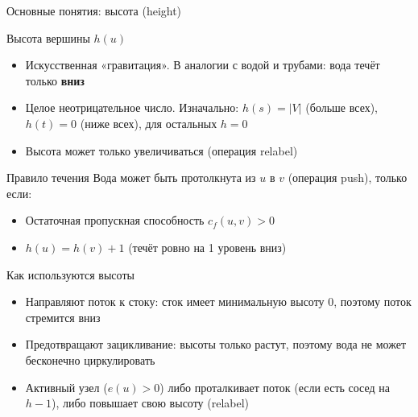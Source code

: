 \documentclass[14pt, aspectratio=169]{beamer}
\begin{document}
\begin{frame}{Основные понятия: высота (height)}
\scriptsize
\begin{block}{Высота вершины $h(u)$}
\begin{itemize}
\item Искусственная «гравитация». В аналогии с водой и трубами: вода течёт только \textbf{вниз}
\item Целое неотрицательное число. Изначально: $h(s) = |V|$ (больше всех), $h(t) = 0$ (ниже всех), для остальных $h = 0$ %
\item Высота может только увеличиваться (операция relabel)
\end{itemize}
\end{block}

\begin{block}{Правило течения}
Вода может быть протолкнута из $u$ в $v$ (операция push), только если:
\begin{itemize}
\item Остаточная пропускная способность $c_f(u, v) > 0$
\item $h(u) = h(v) + 1$ (течёт ровно на 1 уровень вниз)
\end{itemize}
\end{block}

\begin{block}{Как используются высоты}
\begin{itemize}
\item Направляют поток к стоку: сток имеет минимальную высоту 0, поэтому поток стремится вниз
\item Предотвращают зацикливание: высоты только растут, поэтому вода не может бесконечно циркулировать
\item Активный узел ($e(u) > 0$) либо проталкивает поток (если есть сосед на $h-1$), либо повышает свою высоту (relabel)
\end{itemize}
\end{block}
\end{frame}
\end{document}
